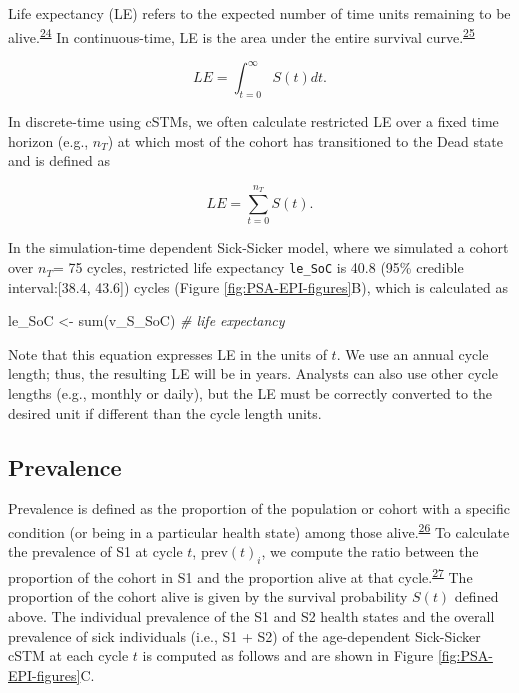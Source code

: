 \documentclass[
]{article}
\newenvironment{Shaded}{\begin{snugshade}}{\end{snugshade}}
\newcommand{\CommentTok}[1]{\textcolor[rgb]{0.56,0.35,0.01}{\textit{#1}}}
\newcommand{\FunctionTok}[1]{\textcolor[rgb]{0.00,0.00,0.00}{#1}}
\newcommand{\NormalTok}[1]{#1}
\newcommand{\OtherTok}[1]{\textcolor[rgb]{0.56,0.35,0.01}{#1}}
\begin{document}
Life expectancy (LE) refers to the expected number of time units remaining to be alive.\textsuperscript{\protect\hyperlink{ref-Lee2003a}{24}} In continuous-time, LE is the area under the entire survival curve.\textsuperscript{\protect\hyperlink{ref-Klein2003}{25}}

\[
LE = \int_{t=0}^{\infty}{S(t) dt}.
\]

In discrete-time using cSTMs, we often calculate restricted LE over a fixed time horizon (e.g., \(n_T\)) at which most of the cohort has transitioned to the Dead state and is defined as

\[
  LE = \sum_{t=0}^{n_T}{S(t)}.
\]

In the simulation-time dependent Sick-Sicker model, where we simulated a cohort over \(n_T\)= 75 cycles, restricted life expectancy \texttt{le\_SoC} is 40.8 (95\% credible interval:{[}38.4, 43.6{]}) cycles (Figure \ref{fig:PSA-EPI-figures}B), which is calculated as

\begin{Shaded}
\begin{Highlighting}[]
\NormalTok{le\_SoC }\OtherTok{\textless{}{-}} \FunctionTok{sum}\NormalTok{(v\_S\_SoC) }\CommentTok{\# life expectancy}
\end{Highlighting}
\end{Shaded}

Note that this equation expresses LE in the units of \(t\). We use an annual cycle length; thus, the resulting LE will be in years. Analysts can also use other cycle lengths (e.g., monthly or daily), but the LE must be correctly converted to the desired unit if different than the cycle length units.

\hypertarget{prevalence}{%
\subsection{Prevalence}\label{prevalence}}

Prevalence is defined as the proportion of the population or cohort with a specific condition (or being in a particular health state) among those alive.\textsuperscript{\protect\hyperlink{ref-Rothman2008h}{26}} To calculate the prevalence of S1 at cycle \(t\), \(\text{prev}(t)_i\), we compute the ratio between the proportion of the cohort in S1 and the proportion alive at that cycle.\textsuperscript{\protect\hyperlink{ref-Keiding1991}{27}} The proportion of the cohort alive is given by the survival probability \(S(t)\) defined above. The individual prevalence of the S1 and S2 health states and the overall prevalence of sick individuals (i.e., S1 + S2) of the age-dependent Sick-Sicker cSTM at each cycle \(t\) is computed as follows and are shown in Figure \ref{fig:PSA-EPI-figures}C.
\end{document}
